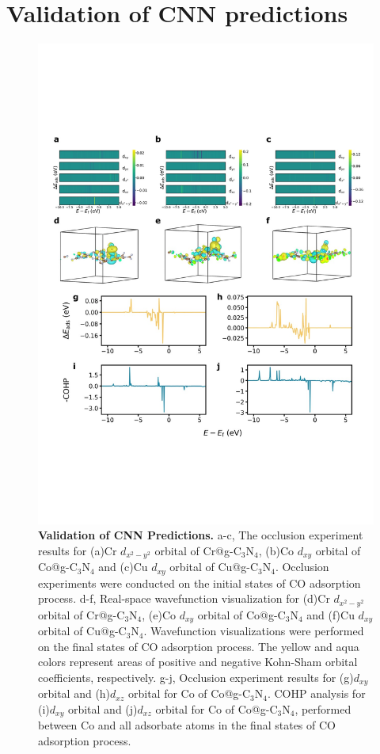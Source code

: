 

\section{Validation of CNN predictions}

\begin{figure}
    \centering
    \includegraphics[width=0.95\linewidth]{main_sections/figures/figure_4.JPG}
    \caption{\textbf{Validation of CNN Predictions.}
    a-c, The occlusion experiment results for (a)Cr $d_{x^2-y^2}$ orbital of Cr@g-$\mathrm{C_3N_4}$, (b)Co $d_{xy}$ orbital of Co@g-$\mathrm{C_3N_4}$ and (c)Cu $d_{xy}$ orbital of Cu@g-$\mathrm{C_3N_4}$.
    Occlusion experiments were conducted on the initial states of CO adsorption process.
    d-f, Real-space wavefunction visualization for (d)Cr $d_{x^2-y^2}$ orbital of Cr@g-$\mathrm{C_3N_4}$, (e)Co $d_{xy}$ orbital of Co@g-$\mathrm{C_3N_4}$ and (f)Cu $d_{xy}$ orbital of Cu@g-$\mathrm{C_3N_4}$.
    Wavefunction visualizations were performed on the final states of CO adsorption process.
    The yellow and aqua colors represent areas of positive and negative Kohn-Sham orbital coefficients, respectively.
    g-j, Occlusion experiment results for (g)$d_{xy}$ orbital and (h)$d_{xz}$ orbital for Co of Co@g-$\mathrm{C_3N_4}$.
    COHP analysis for (i)$d_{xy}$ orbital and (j)$d_{xz}$ orbital for Co of Co@g-$\mathrm{C_3N_4}$, performed between Co and all adsorbate atoms in the final states of CO adsorption process.}
    \label{main_fig4:validation}
\end{figure}

